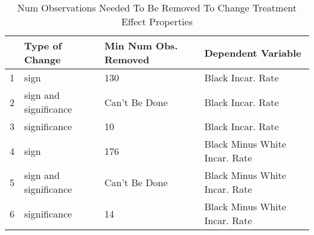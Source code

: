 \begin{table}[ht]
\centering
\begin{tabular}{rlll}
  \hline
 & Type of Change & Min Num Obs. Removed & Dependent Variable \\ 
  \hline
1 & sign & 130 & Black Incar. Rate \\ 
  2 & sign and significance & Can't Be Done & Black Incar. Rate \\ 
  3 & significance & 10 & Black Incar. Rate \\ 
  4 & sign & 176 & Black Minus White Incar. Rate \\ 
  5 & sign and significance & Can't Be Done & Black Minus White Incar. Rate \\ 
  6 & significance & 14 & Black Minus White Incar. Rate \\ 
   \hline
\end{tabular}
\caption{Num Observations Needed To Be Removed To Change Treatment Effect Properties} 
\label{table_mip}
\end{table}
